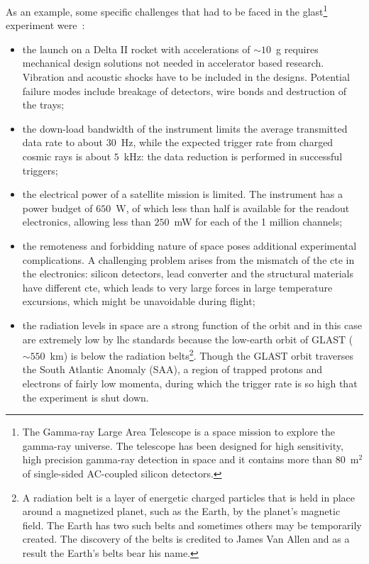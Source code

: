 As an example, some specific challenges that had to be faced in the
\gls{glast}\footnote{The Gamma-ray Large Area Telescope is a space mission to
  explore the gamma-ray universe. The telescope has been designed for high
  sensitivity, high precision gamma-ray detection in space and it contains more
  than $80$~m$^{2}$ of single-sided AC-coupled silicon detectors.} experiment
were~\cite{Sadrozinski_c}:
\begin{itemize}
\item the launch on a Delta II rocket with accelerations of $\sim 10$~g requires
  mechanical design solutions not needed in accelerator based
  research. Vibration and acoustic shocks have to be included in the
  designs. Potential failure modes include breakage of detectors, wire bonds and
  destruction of the trays;
\item the down-load bandwidth of the instrument limits the average transmitted
  data rate to about $30$~Hz, while the expected trigger rate from charged
  cosmic rays is about $5$~kHz: the data reduction is performed in successful
  triggers;
\item the electrical power of a satellite mission is limited. The instrument has
  a power budget of $650$~W, of which less than half is available for the
  readout electronics, allowing less than $250$~mW for each of the 1 million
  channels;
\item the remoteness and forbidding nature of space poses additional
  experimental complications. A challenging problem arises from the mismatch of
  the \gls{cte} in the electronics: silicon detectors, lead converter and the
  structural materials have different \gls{cte}, which leads to very large
  forces in large temperature excursions, which might be unavoidable during
  flight;
\item the radiation levels in space are a strong function of the orbit and in
  this case are extremely low by \gls{lhc} standards because the low-earth orbit
  of GLAST ($\sim 550$~km) is below the radiation belts\footnote{A radiation
    belt is a layer of energetic charged particles that is held in place around
    a magnetized planet, such as the Earth, by the planet's magnetic field. The
    Earth has two such belts and sometimes others may be temporarily
    created. The discovery of the belts is credited to James Van Allen and as a
    result the Earth's belts bear his name.}. Though the GLAST orbit traverses
  the South Atlantic Anomaly (SAA), a region of trapped protons and electrons of
  fairly low momenta, during which the trigger rate is so high that the
  experiment is shut down.
\end{itemize}





